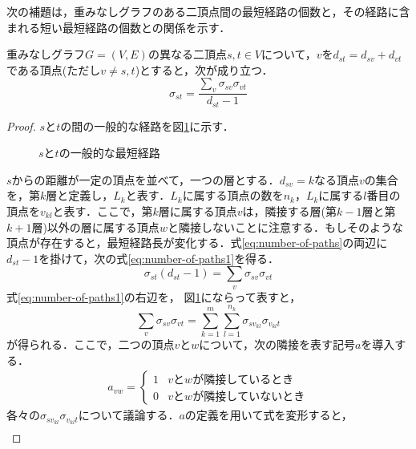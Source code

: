 次の補題は，重みなしグラフのある二頂点間の最短経路の個数と，その経路に含まれる短い最短経路の個数との関係を示す．
\begin{lemma}
  \label{lemma:number-of-paths}
  重みなしグラフ$G=(V,E)$の異なる二頂点$s,t\in V$について，$v$を$d_{st}=d_{sv}+d_{vt}$
  である頂点(ただし$v\neq s,t$)とすると，次が成り立つ．
  \begin{equation}
    \label{eq:number-of-paths}
    \sigma_{st}=\frac{\sum_{v}\sigma_{sv}\sigma_{vt}}{d_{st}-1}
  \end{equation}
\end{lemma}
\begin{proof}
  $s$と$t$の間の一般的な経路を図\ref{fig:proof-number-of-paths}に示す．
  \begin{figure}
    \centering
    \def\svgwidth{.5\columnwidth}
    
    \caption{$s$と$t$の一般的な最短経路}
    \label{fig:proof-number-of-paths}
  \end{figure}
  $s$からの距離が一定の頂点を並べて，一つの層とする．$d_{sv}=k$なる頂点$v$の集合を，第$k$層と定義し，$L_k$と表す．$L_k$に属する頂点の数を$n_k$，$L_k$に属する$l$番目の頂点を$v_{kl}$と表す．ここで，第$k$層に属する頂点$v$は，隣接する層(第$k-1$層と第$k+1$層)以外の層に属する頂点$w$と隣接しないことに注意する．もしそのような頂点が存在すると，最短経路長が変化する．式\eqref{eq:number-of-paths}の両辺に$d_{st}-1$を掛けて，次の式\eqref{eq:number-of-paths1}を得る．
  \begin{equation}
    \sigma_{st}(d_{st}-1)=\sum_{v}\sigma_{sv}\sigma_{vt}
    \label{eq:number-of-paths1}
  \end{equation}
  式\eqref{eq:number-of-paths1}の右辺を，
  図\ref{fig:proof-number-of-paths}にならって表すと，
  \begin{equation}
    \sum_{v}\sigma_{sv}\sigma_{vt}=
    \sum_{k=1}^m\sum_{l=1}^{n_k}\sigma_{sv_{kl}}\sigma_{v_{kl}t}
    \label{eq:number-of-paths2}
  \end{equation}
  が得られる．ここで，二つの頂点$v$と$w$について，次の隣接を表す記号$a$を導入する．
  \begin{align*}
    a_{vw}=
    \begin{cases}
      1 & vとwが隣接しているとき \\
      0 & vとwが隣接していないとき
    \end{cases}
  \end{align*}
  各々の$\sigma_{sv_{kl}}\sigma_{v_{kl}t}$について議論する．$a$の定義を用いて式を変形すると，
  \begin{align}

\end{align}
\end{proof}
